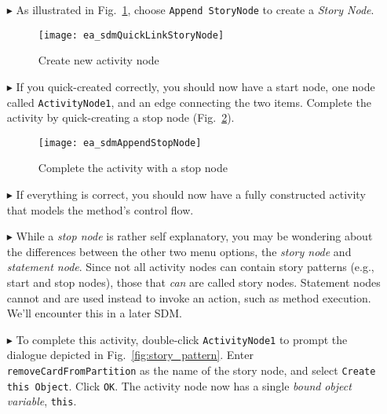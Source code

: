 \begin{itemize}
\item[$\blacktriangleright$] As illustrated in Fig.~\ref{fig:sdm_new_activity_node}, choose \texttt{Append StoryNode} to create a \emph{Story Node}.

\begin{figure}[htp]
\begin{center}
  \texttt{[image: ea\_sdmQuickLinkStoryNode]}
  \caption{Create new activity node}  
  \label{fig:sdm_new_activity_node}
\end{center}
\end{figure}

\item[$\blacktriangleright$] If you quick-created correctly, you should now have a start node, one node called \texttt{ActivityNode1}, and an edge
connecting the two items. Complete the activity by quick-creating a stop node (Fig.~\ref{fig:sdm_stop_node}).

\begin{figure}[htp]
\begin{center}
  \texttt{[image: ea\_sdmAppendStopNode]}
  \caption{Complete the activity with a stop node}  
  \label{fig:sdm_stop_node}
\end{center}
\end{figure}

\vspace{0.5cm}

\item[$\blacktriangleright$] If everything is correct, you should now have a fully constructed activity that models the method's control flow.

\item[$\blacktriangleright$] While a \emph{stop node} is rather self explanatory, you may be wondering about the differences between the other two menu options,
the \emph{story node} and \emph{statement node}. Since not all activity nodes can contain story patterns (e.g., start
and stop nodes), those that \emph{can} are called story nodes. Statement nodes cannot and are used instead to invoke an action, such as method execution. We'll
encounter this in a later SDM.

\item[$\blacktriangleright$] To complete this activity, double-click \texttt{ActivityNode1} to prompt the dialogue depicted in
Fig.~\ref{fig:story_pattern}. Enter \texttt{removeCardFromPartition} as the name of the story node, and select \texttt{Create this Object}.  Click
\texttt{OK}. The activity node now has a single \emph{bound} \emph{object variable}, \texttt{this}.


\end{itemize}
